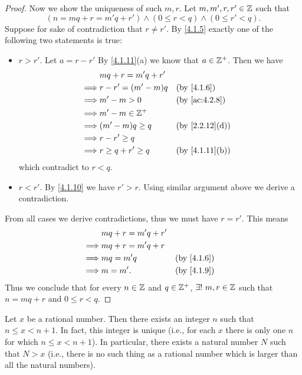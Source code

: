 \begin{proof}
  Now we show the uniqueness of such \(m, r\).
  Let \(m, m', r, r' \in \mathbb{Z}\) such that
  \[
    (n = mq + r = m'q + r') \land (0 \leq r < q) \land (0 \leq r' < q).
  \]
  Suppose for sake of contradiction that \(r \neq r'\).
  By \cref{4.1.5} exactly one of the following two statements is true:
  \begin{itemize}
    \item \(r > r'\).
          Let \(a = r - r'\)
          By \cref{4.1.11}(a) we know that \(a \in \mathbb{Z}^+\).
          Then we have
          \begin{align*}
                     & mq + r = m'q + r'                                      \\
            \implies & r - r' = (m' - m)q   &  & \by{4.1.6}                   \\
            \implies & m' - m > 0           &  & \by{ac:4.2.8}                \\
            \implies & m' - m \in \Z^+                                        \\
            \implies & (m' - m)q \geq q     &  & \text{(by \cref{2.2.12}(d))} \\
            \implies & r - r' \geq q                                          \\
            \implies & r \geq q + r' \geq q &  & \text{(by \cref{4.1.11}(b))}
          \end{align*}
          which contradict to \(r < q\).
    \item \(r < r'\).
          By \cref{4.1.10} we have \(r' > r\).
          Using similar argument above we derive a contradiction.
  \end{itemize}
  From all cases we derive contradictions, thus we must have \(r = r'\).
  This means
  \begin{align*}
             & mq + r = m'q + r'                 \\
    \implies & mq + r = m'q + r                  \\
    \implies & mq = m'q          &  & \by{4.1.6} \\
    \implies & m = m'.           &  & \by{4.1.9}
  \end{align*}
  Thus we conclude that for every \(n \in \mathbb{Z}\) and \(q \in \mathbb{Z}^+\), \(\exists!\ m, r \in \mathbb{Z}\) such that \(n = mq + r\) and \(0 \leq r < q\).
\end{proof}

\begin{prop}\label{4.4.1}
  Let \(x\) be a rational number.
  Then there exists an integer \(n\) such that \(n \leq x < n + 1\).
  In fact, this integer is unique (i.e., for each \(x\) there is only one \(n\) for which \(n \leq x < n + 1\)).
  In particular, there exists a natural number \(N\) such that \(N > x\)
  (i.e., there is no such thing as a rational number which is larger than all the natural numbers).
\end{prop}

